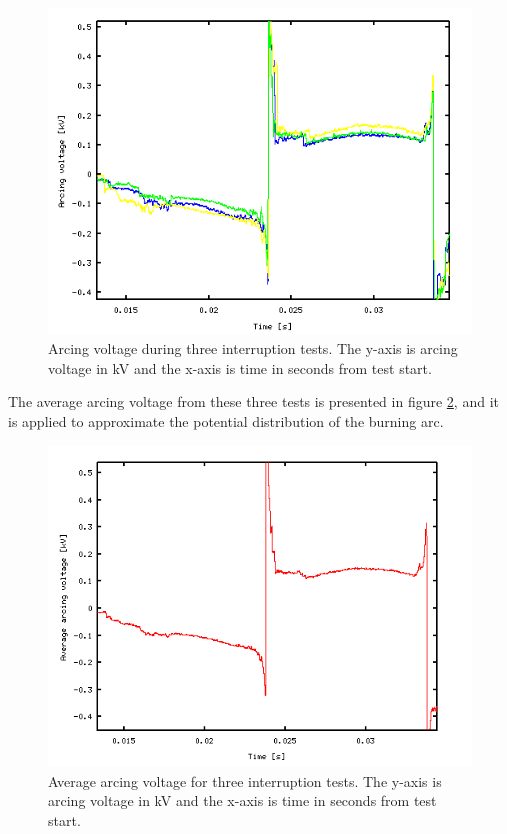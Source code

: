 \documentclass[10pt,b5paper,twoside]{article}
\begin{document}
\begin{figure}[H]
\centering
\includegraphics[scale=0.7]{Bilder/Theory/threeTests.png}
\caption{Arcing voltage during three interruption tests. The y-axis is arcing voltage in kV and the x-axis is time in seconds from test start.} \label{fig:threeTests}
\end{figure}

The average arcing voltage from these three tests is presented in figure \ref{fig:averageArcingVoltage}, and it is applied to approximate the potential distribution of the burning arc.

\begin{figure}[H]
\centering
\includegraphics[scale=0.7]{Bilder/Theory/averageOfthreeTests.png}
\caption{Average arcing voltage for three interruption tests. The y-axis is arcing voltage in kV and the x-axis is time in seconds from test start.} \label{fig:averageArcingVoltage}
\end{figure}
\end{document}
